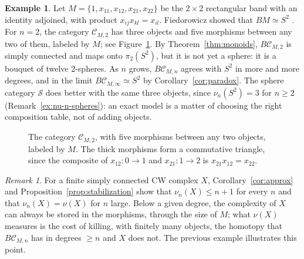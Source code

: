 \documentclass[12pt]{amsart}
\theoremstyle{definition}
\newtheorem{example}[teo]{Example}
\theoremstyle{remark}
\newtheorem{remark}[teo]{Remark}
\newcommand{\CC}{\mathcal{C}}
\newcommand{\co}{\colon}
\newcommand{\Sph}{\mathcal{S}}
\begin{document}
\begin{example}\label{ex:band}
Let $M=\{1,x_{11},x_{12},x_{21},x_{22}\}$ be the $2\times2$ rectangular band with an identity adjoined, with product $x_{ij}x_{kl}=x_{il}$. Fiedorowicz showed that $BM\simeq S^2$ \cite{Fiedorowicz2002}. For $n=2$, the category $\CC_{M,2}$ has three objects and five morphisms between any two of them, labeled by $M$; see Figure~\ref{fig:band}. By Theorem~\ref{thm:monoids}, $B\CC_{M,2}$ is simply connected and maps onto $\pi_2(S^2)$, but it is not yet a sphere: it is a bouquet of twelve $2$-spheres. As $n$ grows, $B\CC_{M,n}$ agrees with $S^2$ in more and more degrees, and in the limit $B\CC_{M,\infty}\simeq S^2$ by Corollary~\ref{cor:paradox}. The sphere category $\Sph$ does better with the same three objects, since $\nu_n(S^2)=3$ for $n\ge2$ (Remark~\ref{ex:nu-n-spheres}): an exact model is a matter of choosing the right composition table, not of adding objects.
\end{example}
 \begin{figure}[ht]
\centering
{}
 
\smallskip
\caption{The category $\CC_{M,2}$, with five morphisms between any two objects, labeled by $M$. The thick morphisms form a commutative triangle, since the composite of $x_{12}\co0\to1$ and $x_{21}\co1\to2$ is $x_{21}x_{12}=x_{22}$.}
\label{fig:band}
\end{figure}

\begin{remark}\label{rem:monoids-general}
For a finite simply connected CW complex $X$, Corollary~\ref{cor:approx} and Proposition~\ref{prop:stabilization} show that $\nu_n(X)\le n+1$ for every $n$ and that $\nu_n(X)=\nu(X)$ for $n$ large. Below a given degree, the complexity of $X$ can always be stored in the morphisms, through the size of $M$; what $\nu(X)$ measures is the cost of killing, with finitely many objects, the homotopy that $B\CC_{M,n}$ has in degrees $\ge n$ and $X$ does not. The previous example illustrates this point.
\end{remark}
\end{document}
